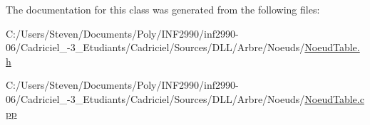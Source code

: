 The documentation for this class was generated from the following files\+:\begin{DoxyCompactItemize}
\item 
C\+:/\+Users/\+Steven/\+Documents/\+Poly/\+I\+N\+F2990/inf2990-\/06/\+Cadriciel\+\_-\/3\+\_\+\+Etudiants/\+Cadriciel/\+Sources/\+D\+L\+L/\+Arbre/\+Noeuds/\hyperlink{_noeud_table_8h}{Noeud\+Table.\+h}\item 
C\+:/\+Users/\+Steven/\+Documents/\+Poly/\+I\+N\+F2990/inf2990-\/06/\+Cadriciel\+\_-\/3\+\_\+\+Etudiants/\+Cadriciel/\+Sources/\+D\+L\+L/\+Arbre/\+Noeuds/\hyperlink{_noeud_table_8cpp}{Noeud\+Table.\+cpp}\end{DoxyCompactItemize}
